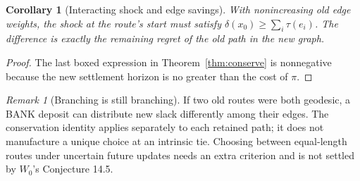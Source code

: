 \documentclass[11pt]{article}
\newtheorem{corollary}[theorem]{Corollary}
\theoremstyle{definition}\newtheorem{definition}[theorem]{Definition}\newtheorem{assumption}[theorem]{Assumption}
\theoremstyle{remark}\newtheorem{remark}[theorem]{Remark}
\begin{document}
\begin{corollary}[Interacting shock and edge savings]\label{cor:edge}
With nonincreasing old edge weights, the shock at the route's start must satisfy $\delta(x_0)\geq\sum_i\tau(e_i)$. The difference is exactly the remaining regret of the old path in the new graph.
\end{corollary}
\begin{proof}
The last boxed expression in Theorem~\ref{thm:conserve} is nonnegative because the new settlement horizon is no greater than the cost of $\pi$.
\end{proof}
\par


\begin{remark}[Branching is still branching]
If two old routes were both geodesic, a BANK deposit can distribute new slack differently among their edges. The conservation identity applies separately to each retained path; it does not manufacture a unique choice at an intrinsic tie. Choosing between equal-length routes under uncertain future updates needs an extra criterion and is not settled by $W_0$'s Conjecture 14.5.
\end{remark}
\end{document}
